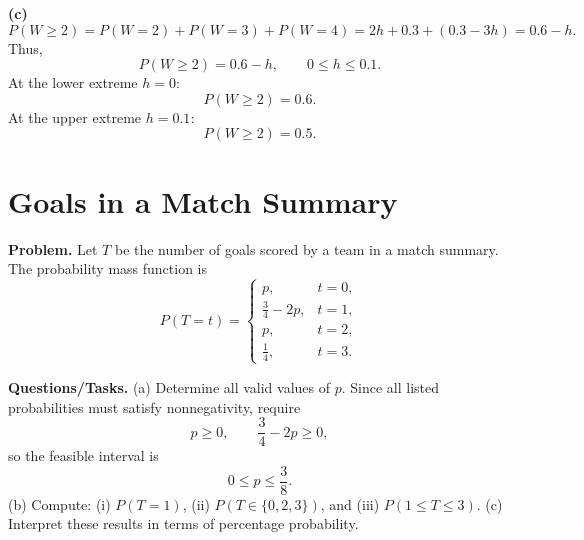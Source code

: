		\textbf{(c)}
		\[
		P(W\ge 2)=P(W=2)+P(W=3)+P(W=4)=2h+0.3+(0.3-3h)=0.6-h.
		\]
		Thus,
		\[
		P(W\ge 2)=0.6-h,\qquad 0\le h\le 0.1.
		\]
		At the lower extreme $h=0$:
		\[
		P(W\ge 2)=0.6.
		\]
		At the upper extreme $h=0.1$:
		\[
		P(W\ge 2)=0.5.
		\]
		\begin{center}
		\hspace{0.35cm}
		\end{center}
		
		\section{Goals in a Match Summary}
		
		\textbf{Problem.}
		Let $T$ be the number of goals scored by a team in a match summary. The probability mass function is
		\[
		P(T=t)=\begin{cases}
			p, & t=0,\\
			\frac{3}{4}-2p, & t=1,\\
			p, & t=2,\\
			\frac{1}{4}, & t=3.
		\end{cases}
		\]
		
		\textbf{Questions/Tasks.}
		(a) Determine all valid values of $p$. Since all listed probabilities must satisfy nonnegativity, require
		\[
		p\ge 0,\qquad \frac{3}{4}-2p\ge 0,
		\]
		so the feasible interval is
		\[
		0\le p\le \frac{3}{8}.
		\]
		(b) Compute: (i) $P(T=1)$, (ii) $P(T\in\{0,2,3\})$, and (iii) $P(1\le T\le 3)$.
		(c) Interpret these results in terms of percentage probability.
		
